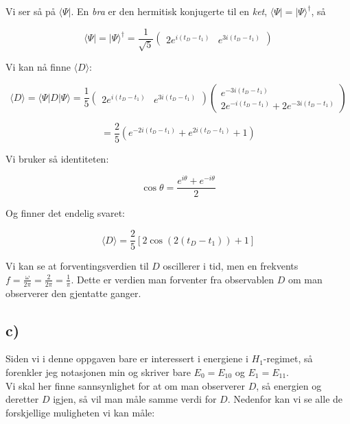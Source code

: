 \documentclass[a4paper,norsk, 10pt]{article}
\numberwithin{equation}{section}
\begin{document}
Vi ser så på $\langle \Psi |$. En \textit{bra} er den hermitisk konjugerte til en \textit{ket}, $\langle\Psi| = |\Psi\rangle^{\dag}$, så

$$
\langle\Psi| = |\Psi\rangle^{\dag} = \frac{1}{\sqrt{5}}
\begin{pmatrix}
2e^{i(t_D - t_1)} &
e^{3i(t_D - t_1)}
\end{pmatrix}
$$

Vi kan nå finne $\langle D \rangle$:

$$
\langle D\rangle = \langle\Psi | D | \Psi \rangle = 
\frac{1}{5}
\begin{pmatrix}
2e^{i(t_D - t_1)} &
e^{3i(t_D - t_1)}
\end{pmatrix}
\begin{pmatrix}
e^{-3i(t_D-t_1)}\\
2e^{-i(t_D-t_1)} + 2e^{-3i(t_D-t_1)}
\end{pmatrix}
$$

$$
= \frac{2}{5}\left(e^{-2i(t_D-t_1)} + e^{2i(t_D-t_1)} + 1\right)
$$

Vi bruker så identiteten:

$$
\cos \theta = \frac{e^{i\theta} + e^{-i\theta}}{2}
$$

Og finner det endelig svaret:

\begin{equation}
\langle D\rangle = \frac{2}{5}\left[2\cos(2(t_D - t_1)) + 1\right]
\label{eq:forventningD}
\end{equation}

Vi kan se at forventingsverdien til $D$ oscillerer i tid, men en frekvents $f = \frac{\omega}{2\pi} = \frac{2}{2\pi} = \frac{1}{\pi}$. Dette er verdien man forventer fra observablen $D$ om man observerer den gjentatte ganger.

\subsection*{c)}

Siden vi i denne oppgaven bare er interessert i energiene i $H_1$-regimet, så forenkler jeg notasjonen min og skriver bare $E_0 = E_{10}$ og $E_1 = E_{11}$.\\

Vi skal her finne sannsynlighet for at om man observerer $D$, så energien og deretter $D$ igjen, så vil man måle samme verdi for $D$. Nedenfor kan vi se alle de forskjellige muligheten vi kan måle:
\end{document}
